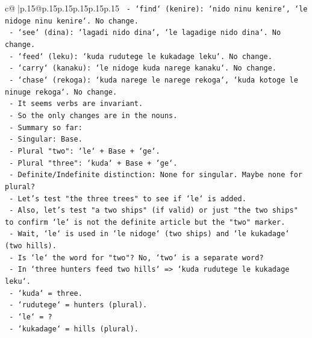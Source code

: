\documentclass{article}
\begin{document}
{\begin{supertabular}{c@{$\;$}|p{.15\linewidth}@{}p{.15\linewidth}p{.15\linewidth}p{.15\linewidth}p{.15\linewidth}p{.15\linewidth}}
{{{\texttt{                   {-} `find` (kenire): `nido ninu kenire`, `le nidoge ninu kenire`. No change.} \\
\texttt{                   {-} `see` (dina): `lagadi nido dina`, `le lagadige nido dina`. No change.} \\
\texttt{                   {-} `feed` (leku): `kuda rudutege le kukadage leku`. No change.} \\
\texttt{                   {-} `carry` (kanaku): `le nidoge kuda narege kanaku`. No change.} \\
\texttt{                   {-} `chase` (rekoga): `kuda narege le narege rekoga`, `kuda kotoge le ninuge rekoga`. No change.} \\
\texttt{                   {-} It seems verbs are invariant.} \\
\texttt{                 {-} So the only changes are in the nouns.} \\
\texttt{                 {-} Summary so far:} \\
\texttt{                   {-} Singular: Base.} \\
\texttt{                   {-} Plural "two": `le` + Base + `ge`.} \\
\texttt{                   {-} Plural "three": `kuda` + Base + `ge`.} \\
\texttt{                   {-} Definite/Indefinite distinction: None for singular. Maybe none for plural?} \\
\texttt{                   {-} Let's test "the three trees" to see if `le` is added.} \\
\texttt{                   {-} Also, let's test "a two ships" (if valid) or just "the two ships" to confirm `le` is not the definite article but the "two" marker.} \\
\texttt{                   {-} Wait, `le` is used in `le nidoge` (two ships) and `le kukadage` (two hills).} \\
\texttt{                   {-} Is `le` the word for "two"? No, `two` is a separate word?} \\
\texttt{                   {-} In `three hunters feed two hills` => `kuda rudutege le kukadage leku`.} \\
\texttt{                     {-} `kuda` = three.} \\
\texttt{                     {-} `rudutege` = hunters (plural).} \\
\texttt{                     {-} `le` = ?} \\
\texttt{                     {-} `kukadage` = hills (plural).} \\
}}}
\end{supertabular}}
\end{document}
